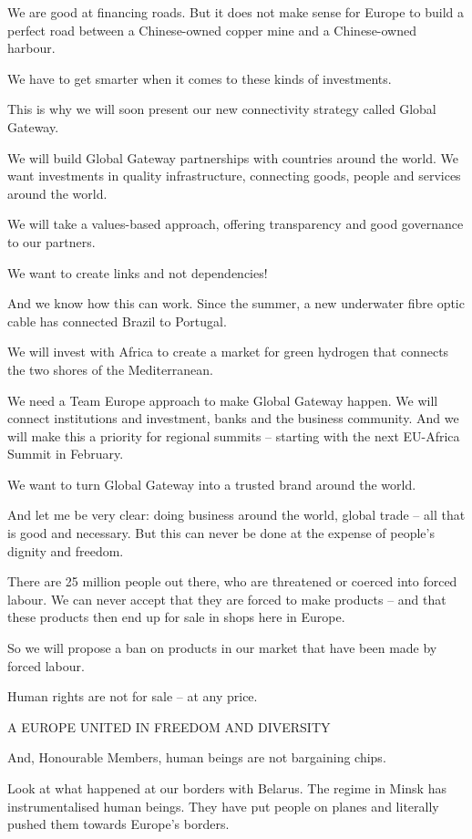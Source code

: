 \documentclass[a4paper,11pt]{article}
\begin{document}
We are good at financing roads. But it does not make sense for Europe to build a perfect road between a Chinese-owned copper mine and a Chinese-owned harbour.

We have to get smarter when it comes to these kinds of investments.

This is why we will soon present our new connectivity strategy called Global Gateway.

We will build Global Gateway partnerships with countries around the world. We want investments in quality infrastructure, connecting goods, people and services around the world. 

We will take a values-based approach, offering transparency and good governance to our partners.

We want to create links and not dependencies!

And we know how this can work. Since the summer, a new underwater fibre optic cable has connected Brazil to Portugal.

We will invest with Africa to create a market for green hydrogen that connects the two shores of the Mediterranean.

We need a Team Europe approach to make Global Gateway happen. We will connect institutions and investment, banks and the business community. And we will make this a priority for regional summits – starting with the next EU-Africa Summit in February. 

We want to turn Global Gateway into a trusted brand around the world.

And let me be very clear: doing business around the world, global trade – all that is good and necessary. But this can never be done at the expense of people's dignity and freedom.

There are 25 million people out there, who are threatened or coerced into forced labour. We can never accept that they are forced to make products – and that these products then end up for sale in shops here in Europe.

So we will propose a ban on products in our market that have been made by forced labour.

Human rights are not for sale – at any price.

 

A EUROPE UNITED IN FREEDOM AND DIVERSITY

 

And, Honourable Members, human beings are not bargaining chips.

Look at what happened at our borders with Belarus. The regime in Minsk has instrumentalised human beings. They have put people on planes and literally pushed them towards Europe's borders.
\end{document}
